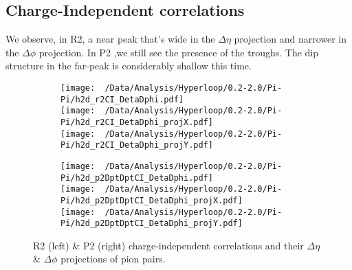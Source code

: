 \documentclass[12pt,a4paper,twoside]{report}
\begin{document}
\subsection{Charge-Independent correlations}
We observe, in R2, a near peak that's wide in the $\Delta\eta$ projection and narrower in the $\Delta\phi$ projection. In P2 ,we still see the presence of the troughs. The dip structure in the far-peak is considerably shallow this time.
\begin{figure}[H]
	\begin{subfigure}{0.49\linewidth}
		\texttt{[image: ~/Data/Analysis/Hyperloop/0.2-2.0/Pi-Pi/h2d\_r2CI\_DetaDphi.pdf]}\\
		\texttt{[image: ~/Data/Analysis/Hyperloop/0.2-2.0/Pi-Pi/h2d\_r2CI\_DetaDphi\_projX.pdf]}\\
		\texttt{[image: ~/Data/Analysis/Hyperloop/0.2-2.0/Pi-Pi/h2d\_r2CI\_DetaDphi\_projY.pdf]}\\
	\end{subfigure}
	\begin{subfigure}{0.49\linewidth}
		\texttt{[image: ~/Data/Analysis/Hyperloop/0.2-2.0/Pi-Pi/h2d\_p2DptDptCI\_DetaDphi.pdf]}\\
		\texttt{[image: ~/Data/Analysis/Hyperloop/0.2-2.0/Pi-Pi/h2d\_p2DptDptCI\_DetaDphi\_projX.pdf]}\\
		\texttt{[image: ~/Data/Analysis/Hyperloop/0.2-2.0/Pi-Pi/h2d\_p2DptDptCI\_DetaDphi\_projY.pdf]}\\
	\end{subfigure}
	\caption{R2 (left) \& P2 (right) charge-independent correlations and their $\Delta\eta$ \& $\Delta\phi$ projections of pion pairs.}
\end{figure}
\end{document}
